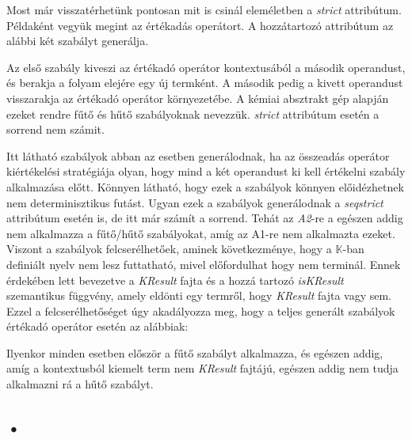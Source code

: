 Most már visszatérhetünk pontosan mit is csinál eleméletben a \textit{strict} attribútum. Példaként vegyük megint az értékadás operátort. A hozzátartozó attribútum az alábbi két szabályt generálja.



Az első szabály kiveszi az értékadó operátor kontextusából a második operandust, és berakja a folyam elejére egy új termként. A második pedig a kivett operandust visszarakja az értékadó operátor környezetébe. A kémiai absztrakt gép alapján ezeket rendre fűtő és hűtő szabályoknak nevezzük. \textit{strict} attribútum esetén a sorrend nem számit.



Itt látható szabályok abban az esetben generálodnak, ha az összeadás operátor kiértékelési stratégiája olyan, hogy mind a két operandust ki kell értékelni szabály alkalmazása előtt. Könnyen látható, hogy ezek a szabályok könnyen előidézhetnek nem determinisztikus futást. Ugyan ezek a szabályok generálodnak a \textit{seqstrict} attribútum esetén is, de itt már számít a sorrend. Tehát az \textit{A2}-re a egészen addig nem alkalmazza a fűtő/hűtő szabályokat, amíg az A1-re nem alkalmazta ezeket. Viszont a szabályok felcserélhetőek, aminek következménye, hogy a $\mathbb{K}$-ban definiált nyelv nem lesz futtatható, mivel előfordulhat hogy nem terminál. Ennek érdekében lett bevezetve a \textit{KResult} fajta és a hozzá tartozó \textit{isKResult} szemantikus függvény, amely eldönti egy termről, hogy \textit{KResult} fajta vagy sem. Ezzel a felcserélhetőséget úgy akadályozza meg, hogy a teljes generált szabályok értékadó operátor esetén az alábbiak:



Ilyenkor minden esetben először a fűtő szabályt alkalmazza, és egészen addig, amíg a kontextusból kiemelt term nem \textit{KResult} fajtájú, egészen addig nem tudja alkalmazni rá a hűtő szabályt.

\subsection{•}



